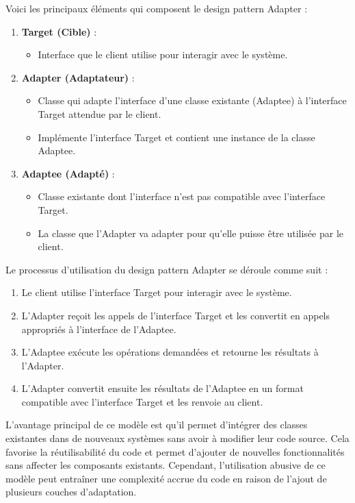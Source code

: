 \documentclass[french]{article}
\begin{document}
Voici les principaux éléments qui composent le design pattern Adapter :

\begin{enumerate}
    \item \textbf{Target (Cible)} :
    \begin{itemize}
        \item Interface que le client utilise pour interagir avec le système.
    \end{itemize}
    
    \item \textbf{Adapter (Adaptateur)} :
    \begin{itemize}
        \item Classe qui adapte l'interface d'une classe existante (Adaptee) à l'interface Target attendue par le client.
        \item Implémente l'interface Target et contient une instance de la classe Adaptee.
    \end{itemize}
    
    \item \textbf{Adaptee (Adapté)} :
    \begin{itemize}
        \item Classe existante dont l'interface n'est pas compatible avec l'interface Target.
        \item La classe que l'Adapter va adapter pour qu'elle puisse être utilisée par le client.
    \end{itemize}
\end{enumerate}

Le processus d'utilisation du design pattern Adapter se déroule comme suit :

\begin{enumerate}
    \item Le client utilise l'interface Target pour interagir avec le système.
    \item L'Adapter reçoit les appels de l'interface Target et les convertit en appels appropriés à l'interface de l'Adaptee.
    \item L'Adaptee exécute les opérations demandées et retourne les résultats à l'Adapter.
    \item L'Adapter convertit ensuite les résultats de l'Adaptee en un format compatible avec l'interface Target et les renvoie au client.
\end{enumerate}

L'avantage principal de ce modèle est qu'il permet d'intégrer des classes existantes dans de nouveaux systèmes sans avoir à modifier leur code source. Cela favorise la réutilisabilité du code et permet d'ajouter de nouvelles fonctionnalités sans affecter les composants existants. Cependant, l'utilisation abusive de ce modèle peut entraîner une complexité accrue du code en raison de l'ajout de plusieurs couches d'adaptation.
\end{document}
